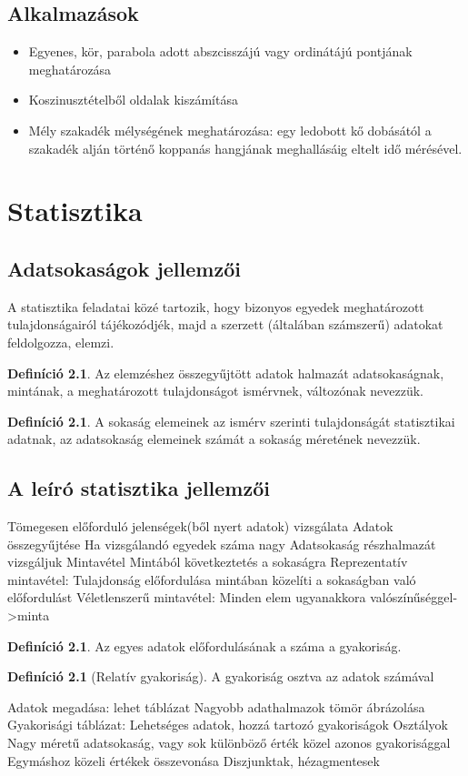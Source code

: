 \documentclass[twoside,12pt]{report}
\theoremstyle{definition}
\newtheorem{definition}[theorem]{Definíció}
\begin{document}
\section{Alkalmazások}
	\begin{itemize}
		\item Egyenes, kör, parabola adott abszcisszájú vagy ordinátájú pontjának meghatározása
		\item Koszinusztételből oldalak kiszámítása
		\item Mély szakadék mélységének meghatározása: egy ledobott kő dobásától a szakadék alján történő koppanás hangjának meghallásáig eltelt idő mérésével.
	\end{itemize}
\chapter{Statisztika}
\section{Adatsokaságok jellemzői}
	A statisztika feladatai közé tartozik, hogy bizonyos egyedek meghatározott tulajdonságairól
	tájékozódjék, majd a szerzett (általában számszerű) adatokat feldolgozza, elemzi.
	\begin{definition}
		Az	elemzéshez összegyűjtött adatok halmazát adatsokaságnak, mintának, a meghatározott tulajdonságot ismérvnek, változónak nevezzük.
	\end{definition}
	\begin{definition}
		A sokaság elemeinek az ismérv szerinti tulajdonságát statisztikai adatnak, az adatsokaság elemeinek számát a sokaság méretének nevezzük.
	\end{definition}
\section{A leíró statisztika jellemzői}
	\begin{outline}
		\1 Tömegesen előforduló jelenségek(ből nyert adatok) vizsgálata
		\1 Adatok összegyűjtése
			\2 Ha vizsgálandó egyedek száma nagy
			\2 Adatsokaság részhalmazát vizsgáljuk
				\3 Mintavétel
				\3 Mintából következtetés a sokaságra
			\2 Reprezentatív mintavétel:
				\3 Tulajdonság előfordulása mintában közelíti a sokaságban való előfordulást
			\2 Véletlenszerű mintavétel:
				\3 Minden elem ugyanakkora valószínűséggel->minta
	\end{outline}
	\begin{definition}
		Az egyes adatok előfordulásának a száma a gyakoriság.
	\end{definition}
	\begin{definition}[Relatív gyakoriság]
		A gyakoriság osztva az adatok számával
	\end{definition}
	\begin{outline}
		\1 Adatok megadása: lehet táblázat
			\2 Nagyobb adathalmazok tömör ábrázolása
			\2 Gyakorisági táblázat: Lehetséges adatok, hozzá tartozó gyakoriságok
		\1 Osztályok
			\2 Nagy méretű adatsokaság, vagy sok különböző érték közel azonos gyakorisággal
			\2 Egymáshoz közeli értékek összevonása
			\2 Diszjunktak, hézagmentesek
	\end{outline}
\end{document}
